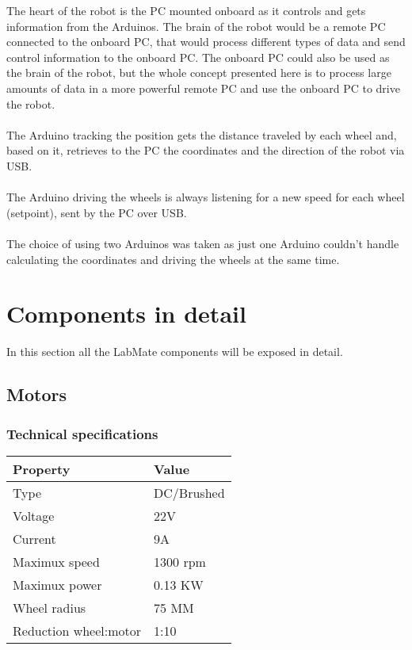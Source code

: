 The heart of the robot is the PC mounted onboard as it controls and gets information from the Arduinos. The brain of the robot would 
be a remote PC connected to the onboard PC, that would process different types of data and send control information to the onboard PC. 
 The onboard PC could also be used as the brain of the robot, but the whole concept presented here is to process large amounts of data in a more powerful remote PC and use the onboard PC 
to drive the robot.
\\ \\
The Arduino tracking the position gets the distance traveled by each wheel and, based on it, retrieves to the PC the coordinates and the 
direction of the robot via USB.
\\ \\
The Arduino driving the wheels is always listening for a new speed for each wheel (setpoint), sent by the PC over USB.
\\ \\
The choice of using two Arduinos was taken as just one Arduino couldn't handle calculating the coordinates and driving the wheels at the same time.

\section{Components in detail}
In this section all the LabMate components will be exposed in detail.

\subsection{Motors}

\subsubsection{Technical specifications}
\begin{center}
    \begin{table}[h]
        \begin{tabularx}{\textwidth}{|X|X|}
            \hline
            \textbf{Property} &  \textbf{Value} \\
            \hline
            Type & DC/Brushed \\
            \hline
            Voltage & 22V \\
            \hline
            Current & 9A \\
            \hline
            Maximux speed & 1300 rpm \\
            \hline
            Maximux power & 0.13 KW \\
            \hline
            Wheel radius & 75 MM \\
            \hline
            Reduction wheel:motor & 1:10 \\
            \hline
        \end{tabularx}
    \end{table}
\end{center}

